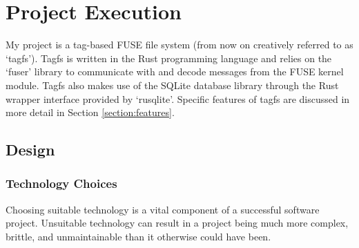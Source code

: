\chapter{Project Execution}
\vspace{1cm}

My project is a tag-based FUSE file system (from now on creatively referred to
as `tagfs'). Tagfs is written in the Rust programming language and relies on
the `fuser' library to communicate with and decode messages from the FUSE
kernel module. Tagfs also makes use of the SQLite database library through the
Rust wrapper interface provided by `rusqlite'. Specific features of tagfs are
discussed in more detail in Section \ref{section:features}. 

\section{Design}

\subsection{Technology Choices}

Choosing suitable technology is a vital component of a successful software
project. Unsuitable technology can result in a project being much more complex,
brittle, and unmaintainable than it otherwise could have been. 

